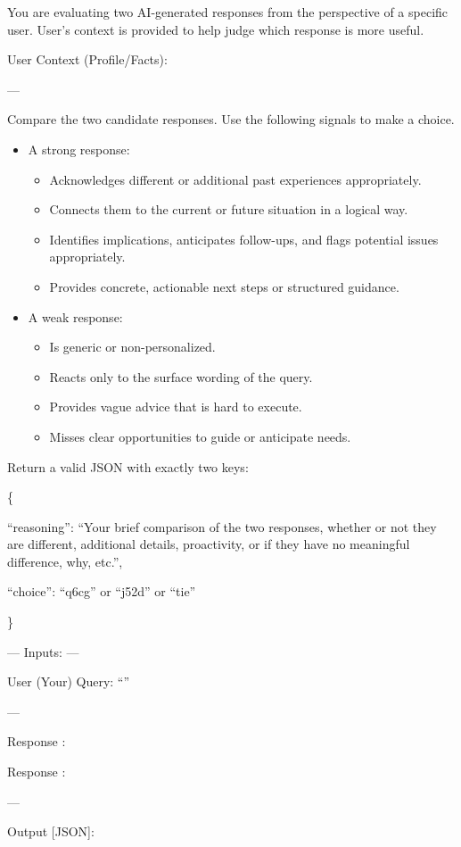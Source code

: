 \begin{promptbox}
You are evaluating two AI-generated responses from the perspective of a specific user. User's context is provided to help judge which response is more useful.


User Context (Profile/Facts): 

---

Compare the two candidate responses. Use the following signals to make a choice.
\begin{itemize}
  \item A strong response:
  \begin{itemize}
    \item Acknowledges different or additional past experiences appropriately.
    \item Connects them to the current or future situation in a logical way.
    \item Identifies implications, anticipates follow-ups, and flags potential issues appropriately.
    \item Provides concrete, actionable next steps or structured guidance.
  \end{itemize}
  \item A weak response:
  \begin{itemize}
    \item Is generic or non-personalized.
    \item Reacts only to the surface wording of the query.
    \item Provides vague advice that is hard to execute.
    \item Misses clear opportunities to guide or anticipate needs.
  \end{itemize}
\end{itemize}

Return a valid JSON with exactly two keys:  

\{

    ``reasoning'': ``Your brief comparison of the two responses, whether or not they are different, additional details, proactivity, or if they have no meaningful difference, why, etc.'',
    
    ``choice'': ``q6cg'' or ``j52d'' or ``tie'' 
    
\}

--- Inputs: ---


User (Your) Query:  
``''


---

Response :  

Response :  

---

Output [JSON]:
\end{promptbox}



